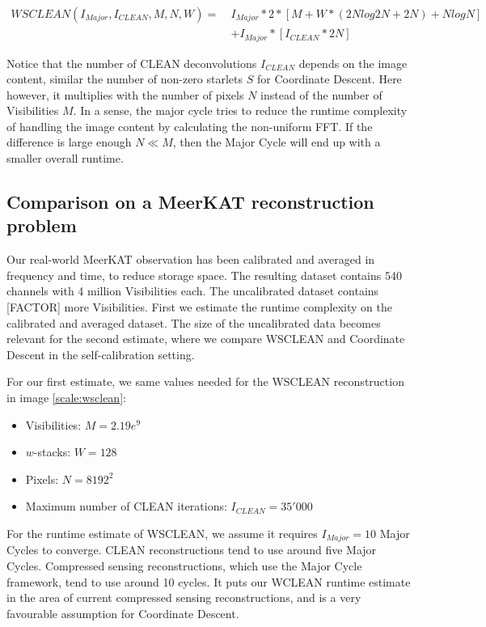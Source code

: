 \begin{equation}\label{results:clean:o}
\begin{aligned}
 WSCLEAN(I_{Major}, I_{CLEAN}, M, N,  W) =\: &I_{Major} * 2 * [M + W*(2N log 2N + 2N) + N log N]\\
	&+ I_{Major} * [I_{CLEAN}*2N]
\end{aligned}
\end{equation}

Notice that the number of CLEAN deconvolutions $I_{CLEAN}$ depends on the image content, similar the number of non-zero starlets $S$ for Coordinate Descent. Here however, it multiplies with the number of pixels $N$ instead of the number of Visibilities $M$. In a sense, the major cycle tries to reduce the runtime complexity of handling the image content by calculating the non-uniform FFT. If the difference is large enough $N \ll M$, then the Major Cycle will end up with a smaller overall runtime.


\subsection{Comparison on a MeerKAT reconstruction problem}
Our real-world MeerKAT observation has been calibrated and averaged in frequency and time, to reduce storage space. The resulting dataset contains 540 channels with 4 million Visibilities each. The uncalibrated dataset contains [FACTOR] more Visibilities. First we estimate the runtime complexity on the calibrated and averaged dataset. The size of the uncalibrated data becomes relevant for the second estimate, where we compare WSCLEAN and Coordinate Descent in the self-calibration setting.

For our first estimate, we same values needed for the WSCLEAN reconstruction in image \ref{scale:wsclean}:
\begin{itemize}
	\item Visibilities: $M=2.19e^9$
	\item $w$-stacks: $W = 128$
	\item Pixels: $N = 8192^2$
	\item Maximum number of CLEAN iterations: $I_{CLEAN} = 35'000$
\end{itemize}

For the runtime estimate of WSCLEAN, we assume it requires $I_{Major}=10$ Major Cycles to converge. CLEAN reconstructions tend to use around five Major Cycles. Compressed sensing reconstructions, which use the Major Cycle framework, tend to use around 10 cycles. It puts our WCLEAN runtime estimate in the area of current compressed sensing reconstructions, and is a very favourable assumption for Coordinate Descent.

